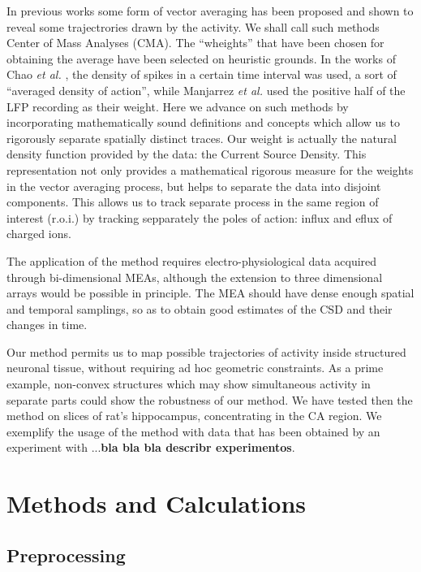 \documentclass{article}
\begin{document}
In previous works some form of vector averaging has been proposed and shown to reveal some trajectrories drawn by the activity. We shall call such methods Center of Mass Analyses (CMA).  The ``wheights'' that have been chosen for obtaining the average have been selected on heuristic grounds. In the works of Chao \emph{et al.} \cite{Chao05, Chao07}, the density of spikes in a certain time interval was used, a sort of ``averaged density of action'', while Manjarrez \emph{et al.} \cite{Manjarrez07, Manjarrez09} used the positive half of the LFP recording as their weight. 
Here we advance on such methods by incorporating mathematically sound definitions and concepts which allow us to rigorously separate spatially distinct traces. Our weight is actually the natural density function provided by the data: the Current Source Density. This representation not only provides a mathematical rigorous  measure for the weights in the vector averaging process, but helps to separate the data into disjoint components. This allows us to track separate process in the same region of interest (r.o.i.) by tracking sepparately the poles of action: influx and eflux of charged ions. 

The application of the method requires electro-physiological data acquired through bi-dimensional MEAs, although the extension to three dimensional arrays would be possible in principle. The MEA should have dense enough spatial and temporal samplings, so as to obtain good estimates of the CSD and their changes in time.

Our method permits us to map possible trajectories of activity inside structured neuronal tissue, without requiring ad hoc geometric constraints. As a prime example, non-convex structures which may show simultaneous activity in separate parts could show the robustness of our method. We have tested then the method on slices of rat's hippocampus, concentrating in the CA region. We exemplify the usage of the method with data that has been obtained by an experiment with ...\textbf{bla bla bla describr experimentos}.




\section{Methods and Calculations}

\subsection{Preprocessing}
\end{document}
